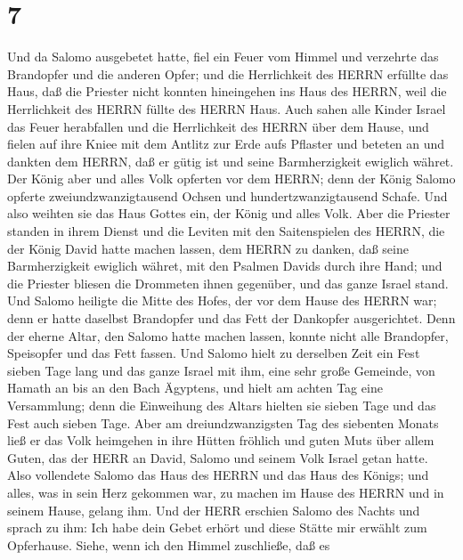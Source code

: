 \hypertarget{section-6}{%
\section{7}\label{section-6}}

 Und da Salomo ausgebetet hatte, fiel ein Feuer vom Himmel
und verzehrte das Brandopfer und die anderen Opfer; und die Herrlichkeit
des HERRN erfüllte das Haus,  daß die Priester nicht konnten
hineingehen ins Haus des HERRN, weil die Herrlichkeit des HERRN füllte
des HERRN Haus.  Auch sahen alle Kinder Israel das Feuer
herabfallen und die Herrlichkeit des HERRN über dem Hause, und fielen
auf ihre Kniee mit dem Antlitz zur Erde aufs Pflaster und beteten an und
dankten dem HERRN, daß er gütig ist und seine Barmherzigkeit ewiglich
währet.  Der König aber und alles Volk opferten vor dem
HERRN;  denn der König Salomo opferte zweiundzwanzigtausend
Ochsen und hundertzwanzigtausend Schafe. Und also weihten sie das Haus
Gottes ein, der König und alles Volk.  Aber die Priester
standen in ihrem Dienst und die Leviten mit den Saitenspielen des HERRN,
die der König David hatte machen lassen, dem HERRN zu danken, daß seine
Barmherzigkeit ewiglich währet, mit den Psalmen Davids durch ihre Hand;
und die Priester bliesen die Drommeten ihnen gegenüber, und das ganze
Israel stand.  Und Salomo heiligte die Mitte des Hofes, der
vor dem Hause des HERRN war; denn er hatte daselbst Brandopfer und das
Fett der Dankopfer ausgerichtet. Denn der eherne Altar, den Salomo hatte
machen lassen, konnte nicht alle Brandopfer, Speisopfer und das Fett
fassen.  Und Salomo hielt zu derselben Zeit ein Fest sieben
Tage lang und das ganze Israel mit ihm, eine sehr große Gemeinde, von
Hamath an bis an den Bach Ägyptens,  und hielt am achten Tag
eine Versammlung; denn die Einweihung des Altars hielten sie sieben Tage
und das Fest auch sieben Tage.  Aber am dreiundzwanzigsten
Tag des siebenten Monats ließ er das Volk heimgehen in ihre Hütten
fröhlich und guten Muts über allem Guten, das der HERR an David, Salomo
und seinem Volk Israel getan hatte.  Also vollendete Salomo
das Haus des HERRN und das Haus des Königs; und alles, was in sein Herz
gekommen war, zu machen im Hause des HERRN und in seinem Hause, gelang
ihm.  Und der HERR erschien Salomo des Nachts und sprach zu
ihm: Ich habe dein Gebet erhört und diese Stätte mir erwählt zum
Opferhause.  Siehe, wenn ich den Himmel zuschließe, daß es
